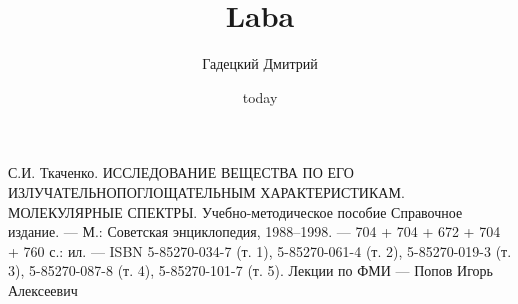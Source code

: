 \documentclass[a4paper,12pt]{article}
\title{Laba}
\author{Гадецкий Дмитрий}
\date{today}
\begin{document}

\renewcommand{\baselinestretch}{1.3}





\begin{thebibliography}{1}
	С.И. Ткаченко. ИССЛЕДОВАНИЕ ВЕЩЕСТВА ПО ЕГО ИЗЛУЧАТЕЛЬНОПОГЛОЩАТЕЛЬНЫМ ХАРАКТЕРИСТИКАМ.
	МОЛЕКУЛЯРНЫЕ СПЕКТРЫ. Учебно-методическое пособие
	Справочное издание. — М.: Советская энциклопедия, 1988–1998. — 704 + 704 + 672 + 704 + 760 с.: ил. — ISBN 5-85270-034-7 (т. 1), 5-85270-061-4 (т. 2), 5-85270-019-3 (т. 3), 5-85270-087-8 (т. 4), 5-85270-101-7 (т. 5).
	Лекции по ФМИ --- Попов Игорь Алексеевич
\end{thebibliography}

%
%
\end{document}
